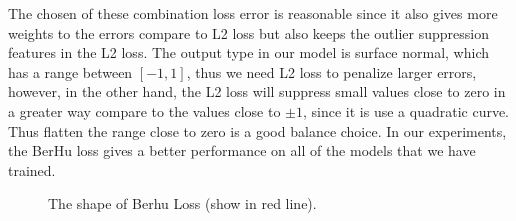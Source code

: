 The chosen of these combination loss error is reasonable since it also gives more weights to the errors compare to L2 loss but also keeps the outlier suppression features in the L2 loss. The output type in our model is surface normal,  which has a range between $ [-1,1] $, thus we need L2 loss to penalize larger errors, however, in the other hand, the L2 loss will suppress small values close to zero in a greater way compare to the values close to $ \pm 1 $, since it is use a quadratic curve. Thus flatten the range close to zero is a good balance choice. In our experiments, the BerHu loss gives a better performance on all of the models that we have trained.
\begin{figure}[H]
	\centering
	
	\caption{The shape of Berhu Loss (show in red line). }
	\label{fig:berhu-loss-shape}
\end{figure}


